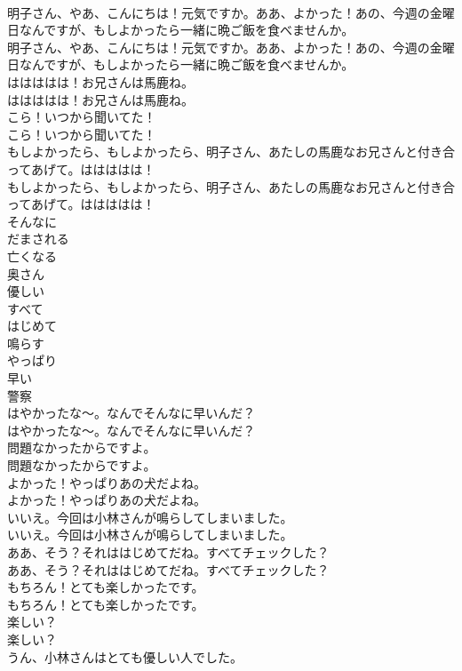 \documentclass[8pt]{extreport}
\begin{document}
\begin{CJK}{UTF8}{min}
\\	明子さん、やあ、こんにちは！元気ですか。ああ、よかった！あの、今週の金曜日なんですが、もしよかったら一緒に晩ご飯を食べませんか。	
\\	明子さん、やあ、こんにちは！元気ですか。ああ、よかった！あの、今週の金曜日なんですが、もしよかったら一緒に晩ご飯を食べませんか。 
\\	ははははは！お兄さんは馬鹿ね。	
\\	ははははは！お兄さんは馬鹿ね。 
\\	こら！いつから聞いてた！	
\\	こら！いつから聞いてた！ 
\\	もしよかったら、もしよかったら、明子さん、あたしの馬鹿なお兄さんと付き合ってあげて。ははははは！	
\\	もしよかったら、もしよかったら、明子さん、あたしの馬鹿なお兄さんと付き合ってあげて。ははははは！ 
\\	そんなに
\\	だまされる
\\	亡くなる
\\	奥さん
\\	優しい
\\	すべて
\\	はじめて
\\	鳴らす
\\	やっぱり
\\	早い
\\	警察
\\	はやかったな〜。なんでそんなに早いんだ？	
\\	はやかったな〜。なんでそんなに早いんだ？ 
\\	問題なかったからですよ。	
\\	問題なかったからですよ。 
\\	よかった！やっぱりあの犬だよね。	
\\	よかった！やっぱりあの犬だよね。 
\\	いいえ。今回は小林さんが鳴らしてしまいました。	
\\	いいえ。今回は小林さんが鳴らしてしまいました。 
\\	ああ、そう？それははじめてだね。すべてチェックした？	
\\	ああ、そう？それははじめてだね。すべてチェックした？ 
\\	もちろん！とても楽しかったです。	
\\	もちろん！とても楽しかったです。 
\\	楽しい？	
\\	楽しい？ 
\\	うん、小林さんはとても優しい人でした。	

\end{CJK}
\end{document}
